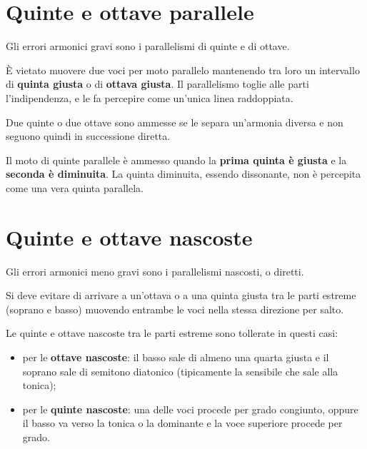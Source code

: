 \section{Quinte e ottave parallele}
\label{sec:quinte_ottave_parallele}

Gli errori armonici gravi sono i parallelismi di quinte e di ottave.

\begin{errore}
	\label{err:quinte_ottave_parallele}
	È vietato muovere due voci per moto parallelo mantenendo tra loro un intervallo di \textbf{quinta giusta} o di \textbf{ottava giusta}. Il parallelismo toglie alle parti l'indipendenza, e le fa percepire come un'unica linea raddoppiata.
\end{errore}

Due quinte o due ottave sono ammesse se le separa un'armonia diversa e non seguono quindi in successione diretta.

\begin{regola}
	\label{reg:quinte_g_dim}
	Il moto di quinte parallele è ammesso quando la \textbf{prima quinta è giusta} e la \textbf{seconda è diminuita}. La quinta diminuita, essendo dissonante, non è percepita come una vera quinta parallela.
\end{regola}

\section{Quinte e ottave nascoste}
\label{sec:quinte_nascoste}

Gli errori armonici meno gravi sono i parallelismi nascosti, o diretti.

\begin{errore}
	\label{err:quinte_nascoste}
	Si deve evitare di arrivare a un'ottava o a una quinta giusta tra le parti estreme (soprano e basso) muovendo entrambe le voci nella stessa direzione per salto.
\end{errore}

\begin{regola}
	\label{reg:eccezioni_nascoste}
	Le quinte e ottave nascoste tra le parti estreme sono tollerate in questi casi:
	\begin{itemize}
		\item per le \textbf{ottave nascoste}: il basso sale di almeno una quarta giusta e il soprano sale di semitono diatonico (tipicamente la sensibile che sale alla tonica);
		\item per le \textbf{quinte nascoste}: una delle voci procede per grado congiunto, oppure il basso va verso la tonica o la dominante e la voce superiore procede per grado.
	\end{itemize}
\end{regola}


